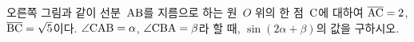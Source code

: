\noindent\begin{minipage}[t]{0.58\linewidth}\vspace{0pt}\raggedright 오른쪽 그림과 같이 선분~$\mathrm{AB}$를 지름으로 하는 원~$O$ 위의 한 점~$\mathrm{C}$에 대하여 $\overline{\mathrm{AC}}=2$, $\overline{\mathrm{BC}}=\sqrt{5}$이다. $\angle\mathrm{CAB}=\alpha$, $\angle\mathrm{CBA}=\beta$라 할 때, $\sin(2\alpha+\beta)$의 값을 구하시오.\end{minipage}\hfill\begin{minipage}[t]{0.4\linewidth}\vspace{0pt}\centering \resizebox{\ifdim\width>\linewidth\linewidth\else\width\fi}{!}{}\end{minipage}\par

